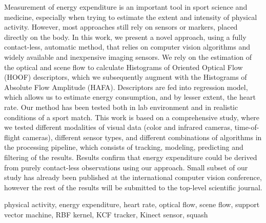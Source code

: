 \abstract
Measurement of energy expenditure is an important tool in sport science and medicine, especially when trying to estimate the extent and intensity of physical activity. However, most approaches still rely on sensors or markers, placed directly on the body. In this work, we present a novel approach, using a fully contact-less, automatic method, that relies on computer vision algorithms and widely available and inexpensive imaging sensors. We rely on the estimation of the optical and scene flow to calculate Histograms of Oriented Optical Flow (HOOF) descriptors, which we subsequently augment with the Histograms of Absolute Flow Amplitude (HAFA). Descriptors are fed into regression model, which allows us to estimate energy consumption, and by lesser extent, the heart rate. Our method has been tested both in lab environment and in realistic conditions of a sport match. This work is based on a comprehensive study, where we tested different modalities of visual data (color and infrared cameras, time-of-flight cameras), different sensor types, and different combinations of algorithms in the processing pipeline, which consists of tracking, modeling, predicting and filtering of the results. Results confirm that energy expenditure could be derived from purely contact-less observations using our approach. Small subset of our study has already been published at the international computer vision conference, however the rest of the results will be submitted to the top-level scientific journal.

\keywords physical activity, energy expenditure, heart rate, optical flow, scene flow, support vector machine, RBF kernel, KCF tracker, Kinect sensor, squash